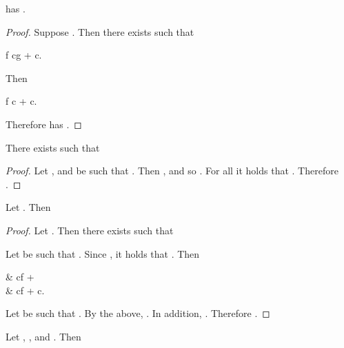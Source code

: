 \documentclass[b5paper, english, oneside]{memoir}
\begin{document}
\begin{theorem}
\label{AffineExtensibility}
 has .
\end{theorem}

\begin{proof}
Suppose . Then there exists  such that
\begin{eqs}
f \leq cg + c.
\end{eqs}
Then
\begin{eqs}
f \circ {} \leq c  + c.
\end{eqs}
Therefore  has .
\end{proof}

\begin{theorem}
\label{AffineSuperHomogenuityFails}
There exists  such that

\end{theorem}

\begin{proof}
Let , and  be such that . Then , and so . For all  it holds that . Therefore .
\end{proof}

\begin{theorem}
\label{AffineSuperMultiplicativity}
Let . Then

\end{theorem}

\begin{proof}
Let . Then there exists  such that

Let  be such that . Since , it holds that . Then
\begin{eqs}
 & \leq cf  +  \\
{} & \leq cf + c.
\end{eqs}
Let  be such that . By the above, . In addition, . Therefore .
\end{proof}

\begin{theorem}
\label{AffinePowerHomogenuity}
Let , , and . Then

\end{theorem}
\end{document}
